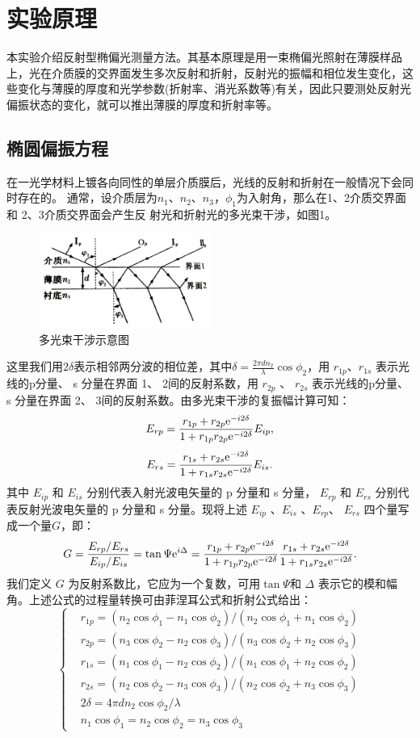 \documentclass[a4paper]{article}
\begin{document}
\section{实验原理}
本实验介绍反射型椭偏光测量方法。其基本原理是用一束椭偏光照射在薄膜样品上，光在介质膜的交界面发生多次反射和折射，反射光的振幅和相位发生变化，这些变化与薄膜的厚度和光学参数(折射率、消光系数等)有关，因此只要测处反射光偏振状态的变化，就可以推出薄膜的厚度和折射率等。

\subsection{椭圆偏振方程}
在一光学材料上镀各向同性的单层介质膜后，光线的反射和折射在一般情况下会同时存在的。 通常，设介质层为$n_1$、$n_2$、$n_3$，$\phi_1$为入射角，那么在1、2介质交界面和 2、3介质交界面会产生反 射光和折射光的多光束干涉，如图1。

\begin{figure}[!h]
\centering
\includegraphics[width = 0.5\textwidth]{fig/1.png}
\caption{多光束干涉示意图}
\end{figure}

这里我们用$2\delta$表示相邻两分波的相位差，其中$\delta=\frac{2\pi dn_2}{\lambda}\cos\phi_2$，用 $r_{1p}$、$r_{1s}$ 表示光线的p分量、 s 分量在界面 1、 2间的反射系数，用	$r_{2p}$  、 $r_{2s}$ 表示光线的p分量、 s 分量在界面 2、 3间的反射系数。由多光束干涉的复振幅计算可知：
$$E_{rp}=\frac{r_{1p}+r_{2p}{\rm e}^{-i2\delta}}{1+r_{1p}r_{2p}{\rm e}^{-i2\delta}}E_{ip},$$
$$E_{rs}=\frac{r_{1s}+r_{2s}{\rm e}^{-i2\delta}}{1+r_{1s}r_{2s}{\rm e}^{-i2\delta}}E_{is}.$$
其中 $E_{ip}$  和 $E_{is}$ 分别代表入射光波电矢量的	p 分量和 s 分量， $E_{rp}$ 和 $E_{rs}$ 分别代表反射光波电矢量的 p 分量和 s 分量。现将上述	$E_{ip}$ 、$E_{is}$ 、$E_{rp}$、 $E_{rs}$ 四个量写成一个量$G$，即：
$$G=\frac{E_{rp}/E_{rs}}{E_{ip}/E_{is}}=\tan\Psi{\rm e}^{i\Delta}=\frac{r_{1p}+r_{2p}{\rm e}^{-i2\delta}}{1+r_{1p}r_{2p}{\rm e}^{-i2\delta}} \frac{r_{1s}+r_{2s}{\rm e}^{-i2\delta}}{1+r_{1s}r_{2s}{\rm e}^{-i2\delta}}.$$
我们定义	$G$ 为反射系数比，它应为一个复数，可用$\tan\Psi$和 $\Delta$ 表示它的模和幅角。上述公式的过程量转换可由菲涅耳公式和折射公式给出：
$$\left\{
\begin{aligned}
&r_{1p}=(n_2\cos\phi_1-n_1\cos\phi_2)/(n_2\cos\phi_1+n_1\cos\phi_2)\\
&r_{2p}=(n_3\cos\phi_2-n_2\cos\phi_3)/(n_3\cos\phi_2+n_2\cos\phi_3)\\
&r_{1s}=(n_1\cos\phi_1-n_2\cos\phi_2)/(n_1\cos\phi_1+n_2\cos\phi_2)\\
&r_{2s}=(n_2\cos\phi_2-n_3\cos\phi_3)/(n_2\cos\phi_2+n_3\cos\phi_3)\\
&2\delta=4\pi dn_2\cos\phi_2/\lambda\\
&n_1\cos\phi_1=n_2\cos\phi_2=n_3\cos\phi_3\end{aligned}\right.$$
\end{document}
